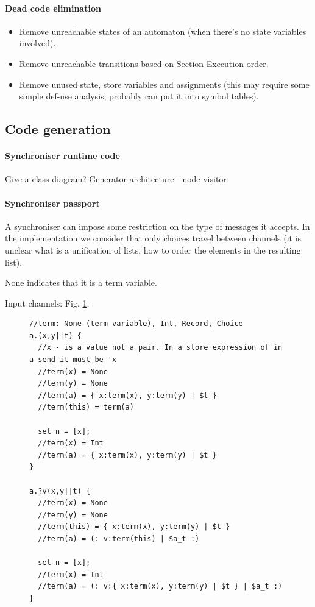   \paragraph{Dead code elimination}
\begin{itemize}
\item Remove unreachable states of an automaton (when there's no state variables involved).

\item Remove unreachable transitions based on Section Execution order.

\item Remove unused state, store variables and assignments (this may require some simple def-use analysis, probably can put it into symbol tables).
\end{itemize}


\subsection{Code generation}
  \paragraph{Synchroniser runtime code}
Give a class diagram?
Generator architecture - node visitor

  \paragraph{Synchroniser passport}
A synchroniser can impose some restriction on the type of messages it accepts.
In the implementation we consider that only choices travel between channels (it is unclear what is a unification of lists, how to order the elements in the resulting list).

None indicates that it is a term variable.

Input channels: Fig. \ref{a}.
\begin{figure}[h!]
\begin{lstlisting}
//term: None (term variable), Int, Record, Choice
a.(x,y||t) {
  //x - is a value not a pair. In a store expression of in a send it must be 'x
  //term(x) = None
  //term(y) = None
  //term(a) = { x:term(x), y:term(y) | $t }
  //term(this) = term(a)

  set n = [x];
  //term(x) = Int
  //term(a) = { x:term(x), y:term(y) | $t }
}

a.?v(x,y||t) {
  //term(x) = None
  //term(y) = None
  //term(this) = { x:term(x), y:term(y) | $t }
  //term(a) = (: v:term(this) | $a_t :)

  set n = [x];
  //term(x) = Int
  //term(a) = (: v:{ x:term(x), y:term(y) | $t } | $a_t :)
}
\end{lstlisting}
\label{a}
\end{figure}

